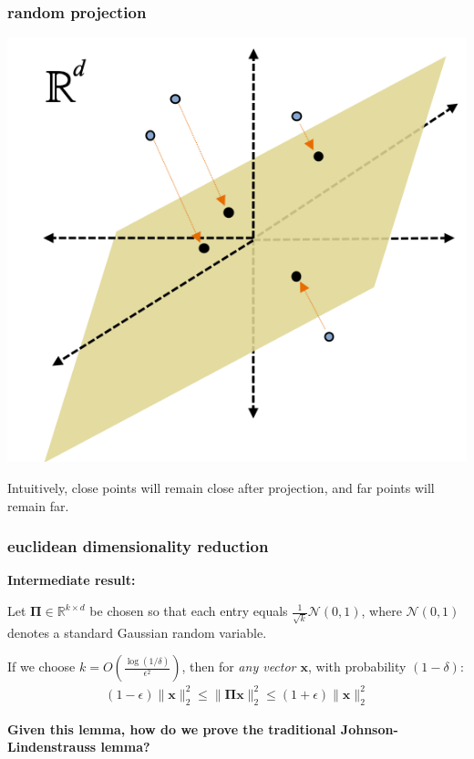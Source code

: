 \documentclass[compress]{beamer}
\newcommand{\bs}[1]{\boldsymbol{#1}}
\newcommand{\bv}[1]{\mathbf{#1}}
\newcommand{\R}{\mathbb{R}}
\begin{document}
\begin{frame}
	\frametitle{random projection}
	\begin{center}
		\includegraphics[width=.6\textwidth]{random_projection.png}
	\end{center}
	Intuitively, close points will remain close after projection, and far points will remain far. 
\end{frame}

\begin{frame}
	\frametitle{euclidean dimensionality reduction}
	\textbf{Intermediate result:}
	\begin{lemma}
		Let $\bs{\Pi} \in \R^{k\times d}$ be chosen so that each entry equals $\frac{1}{\sqrt{k}}  \mathcal{N}(0,1)$, where $\mathcal{N}(0,1)$ denotes a standard Gaussian random variable. 
		
		If we choose $k = O\left(\frac{\log(1/\delta)}{\epsilon^2}\right)$, then for \emph{any vector $\bv{x}$}, with probability $(1-\delta)$:
		\begin{align*}
			(1-\epsilon)\|\bv{x}\|_2^2 \leq \|\bs{\Pi}\bv{x}\|_2^2 \leq (1+\epsilon) \|\bv{x}\|_2^2
		\end{align*}
	\end{lemma}
	
	\begin{center}\alert{
			\textbf{Given this lemma, how do we prove the traditional Johnson-Lindenstrauss lemma?}}
	\end{center}
\end{frame}
\end{document}
